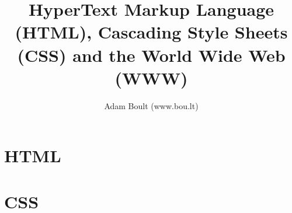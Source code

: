 \documentclass[oneside]{book}
\begin{document}
\author{Adam Boult (www.bou.lt)}
\title{HyperText Markup Language (HTML), Cascading Style Sheets (CSS) and the World Wide Web (WWW)}
\maketitle

\setcounter{tocdepth}{0}
\tableofcontents



\part{HTML}


\part{CSS}

\end{document}
